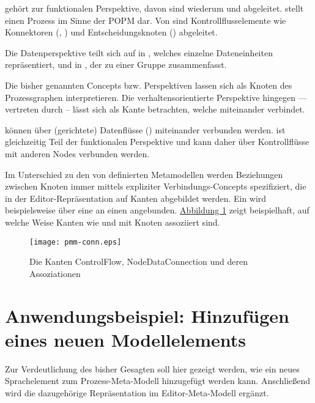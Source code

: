 \documentclass[a4paper,10pt]{sphinxmanual}
\begin{document}
 gehört zur funktionalen Perspektive, davon sind wiederum  und  abgeleitet.
 stellt einen Prozess im Sinne der POPM dar.
Von  sind Kontrollflusselemente wie Konnektoren (, ) und Entscheidungsknoten () abgeleitet.

Die Datenperspektive teilt sich auf in , welches einzelne Dateneinheiten repräsentiert, und in  , der  zu einer Gruppe zusammenfasst.

Die bisher genannten Concepts bzw. Perspektiven lassen sich als Knoten des Prozessgraphen interpretieren.
Die verhaltensorientierte Perspektive hingegen — vertreten durch  – lässt sich als Kante betrachten, welche  miteinander verbindet.

 können über (gerichtete) Datenflüsse () miteinander verbunden werden.
 ist gleichzeitig Teil der funktionalen Perspektive und kann daher über Kontrollflüsse mit anderen Nodes verbunden werden.

Im Unterschied zu den von \cite{volz_werkzeugunterstutzung_2011} definierten Metamodellen werden Beziehungen zwischen Knoten immer mittels expliziter Verbindungs-Concepts spezifiziert, die in der Editor-Repräsentation auf Kanten abgebildet werden.
Ein  wird beispielsweise über eine  an einen  angebunden.
\hyperref[metamodelle:pmm-conn]{Abbildung  \ref*{metamodelle:pmm-conn}} zeigt beispielhaft, auf welche Weise Kanten wie  und  mit Knoten assoziiert sind.
\begin{figure}[htbp]
\centering
\capstart

\texttt{[image: pmm-conn.eps]}
\caption{Die Kanten ControlFlow, NodeDataConnection und deren Assoziationen}\label{metamodelle:pmm-conn}\end{figure}


\section{Anwendungsbeispiel: Hinzufügen eines neuen Modellelements}
\label{metamodelle:anwendungsbeispiel-hinzufugen-eines-neuen-modellelements}\label{metamodelle:beispiel-neues-element}
Zur Verdeutlichung des bisher Gesagten soll hier gezeigt werden, wie ein neues Sprachelement zum Prozess-Meta-Modell hinzugefügt werden kann.
Anschließend wird die dazugehörige Repräsentation im Editor-Meta-Modell ergänzt.
\end{document}
